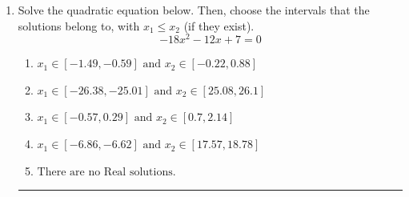 \documentclass[14pt]{extbook}
\newcommand{\litem}[1]{\item#1\hspace*{-1cm}\rule{\textwidth}{0.4pt}}
\begin{document}
\begin{enumerate}
{\begin{enumerate}[label=\Alph*.]
\end{enumerate} }
\litem{
Solve the quadratic equation below. Then, choose the intervals that the solutions belong to, with $x_1 \leq x_2$ (if they exist).\[ -18x^{2} -12 x + 7 = 0 \]\begin{enumerate}[label=\Alph*.]
\item \( x_1 \in [-1.49, -0.59] \text{ and } x_2 \in [-0.22, 0.88] \)
\item \( x_1 \in [-26.38, -25.01] \text{ and } x_2 \in [25.08, 26.1] \)
\item \( x_1 \in [-0.57, 0.29] \text{ and } x_2 \in [0.7, 2.14] \)
\item \( x_1 \in [-6.86, -6.62] \text{ and } x_2 \in [17.57, 18.78] \)
\item \( \text{There are no Real solutions.} \)

\end{enumerate} }
\end{enumerate}
\end{document}
